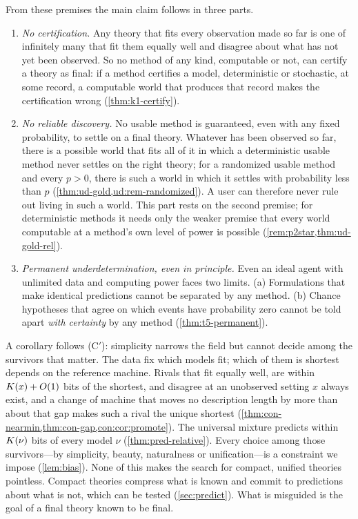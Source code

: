 From these premises the main claim follows in three parts.
\begin{enumerate}[label=(C\arabic*)]
  \item \emph{No certification.} Any theory that fits every observation made so far is one
        of infinitely many that fit them equally well and disagree about what has not yet
        been observed. So no method of any kind, computable or not, can certify a theory
        as final: if a method certifies a model, deterministic or stochastic, at some
        record, a computable world that produces that record makes the certification
        wrong (\cref{thm:k1-certify}).
  \item \emph{No reliable discovery.} No usable method is guaranteed, even with any
        fixed probability, to settle on a final theory. Whatever has been observed so far,
        there is a possible world that fits all of it in which a deterministic usable
        method never settles on the right theory; for a randomized usable method and
        every $p>0$, there is such a world in which it settles with probability less than
        $p$ (\cref{thm:ud-gold,ud:rem-randomized}). A user can therefore never rule out living in such a
        world. This part rests on the second premise; for deterministic methods it needs
        only the weaker premise that every world computable at a method's own level of
        power is possible (\cref{rem:p2star,thm:ud-gold-rel}).
  \item \emph{Permanent underdetermination, even in principle.} Even an ideal agent with
        unlimited data and computing power faces two limits. (a) Formulations that make
        identical predictions cannot be separated by any method. (b) Chance hypotheses
        that agree on which events have probability zero cannot be told apart
        \emph{with certainty} by any method (\cref{thm:t5-permanent}).
\end{enumerate}
A corollary follows (C$'$): simplicity narrows the field but cannot decide among the
survivors that matter. The data fix which models fit; which of them is shortest depends
on the reference machine. Rivals that fit equally well, are within $K(x)+O(1)$ bits of
the shortest, and disagree at an unobserved setting $x$ always exist, and a change of
machine that moves no description length by more than about that gap makes such a rival the
unique shortest (\cref{thm:con-nearmin,thm:con-gap,con:cor:promote}). The universal
mixture predicts within $K(\nu)$ bits of every model $\nu$ (\cref{thm:pred-relative}).
Every choice among those survivors---by
simplicity, beauty, naturalness or unification---is a constraint we impose
(\cref{lem:bias}). None of this makes the search for compact,
unified theories pointless. Compact theories compress what is known and commit to
predictions about what is not, which can be tested (\cref{sec:predict}). What is
misguided is the goal of a final theory known to be final.

